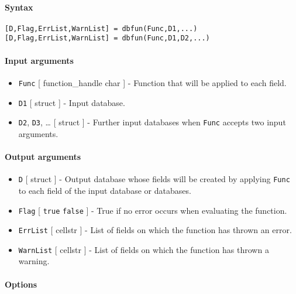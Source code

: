 


	\paragraph{Syntax}\label{syntax}

\begin{verbatim}
[D,Flag,ErrList,WarnList] = dbfun(Func,D1,...)
[D,Flag,ErrList,WarnList] = dbfun(Func,D1,D2,...)
\end{verbatim}

\paragraph{Input arguments}\label{input-arguments}

\begin{itemize}
\item
  \texttt{Func} {[} function\_handle \textbar{} char {]} - Function that
  will be applied to each field.
\item
  \texttt{D1} {[} struct {]} - Input database.
\item
  \texttt{D2}, \texttt{D3}, \ldots{} {[} struct {]} - Further input
  databases when \texttt{Func} accepts two input arguments.
\end{itemize}

\paragraph{Output arguments}\label{output-arguments}

\begin{itemize}
\item
  \texttt{D} {[} struct {]} - Output database whose fields will be
  created by applying \texttt{Func} to each field of the input database
  or databases.
\item
  \texttt{Flag} {[} \texttt{true} \textbar{} \texttt{false} {]} - True
  if no error occurs when evaluating the function.
\item
  \texttt{ErrList} {[} cellstr {]} - List of fields on which the
  function has thrown an error.
\item
  \texttt{WarnList} {[} cellstr {]} - List of fields on which the
  function has thrown a warning.
\end{itemize}

\paragraph{Options}\label{options}

